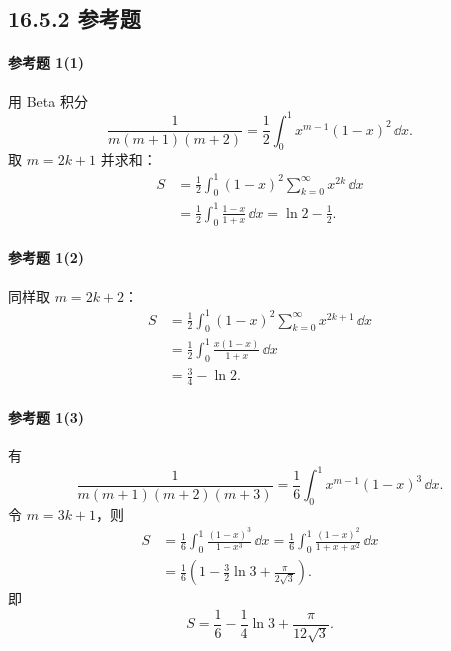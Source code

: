 \subsection*{16.5.2 参考题}

\paragraph{参考题 1(1)}
\begin{xsolution}
用 Beta 积分
\[
  \frac1{m(m+1)(m+2)}
  =\frac12\int_0^1x^{m-1}(1-x)^2\,\dd x.
\]
取 $m=2k+1$ 并求和：
\[
\begin{aligned}
S&=\frac12\int_0^1(1-x)^2\sum_{k=0}^{\infty}x^{2k}\,\dd x\\
 &=\frac12\int_0^1\frac{1-x}{1+x}\,\dd x
 =\ln2-\frac12.
\end{aligned}
\]
\end{xsolution}

\paragraph{参考题 1(2)}
\begin{xsolution}
同样取 $m=2k+2$：
\[
\begin{aligned}
S&=\frac12\int_0^1(1-x)^2\sum_{k=0}^{\infty}x^{2k+1}\,\dd x\\
 &=\frac12\int_0^1\frac{x(1-x)}{1+x}\,\dd x\\
 &=\frac34-\ln2.
\end{aligned}
\]
\end{xsolution}

\paragraph{参考题 1(3)}
\begin{xsolution}
有
\[
  \frac1{m(m+1)(m+2)(m+3)}
  =\frac16\int_0^1x^{m-1}(1-x)^3\,\dd x.
\]
令 $m=3k+1$，则
\[
\begin{aligned}
S&=\frac16\int_0^1\frac{(1-x)^3}{1-x^3}\,\dd x
 =\frac16\int_0^1\frac{(1-x)^2}{1+x+x^2}\,\dd x\\
 &=\frac16\left(1-\frac32\ln3+\frac{\pi}{2\sqrt3}\right).
\end{aligned}
\]
即
\[
  S=\frac16-\frac14\ln3+\frac{\pi}{12\sqrt3}.
\]
\end{xsolution}

